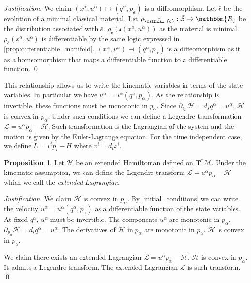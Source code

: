 \documentclass[aps,pra,10pt,twocolumn,floatfix,nofootinbib]{revtex4-1}
\numberwithin{equation}{section}
\theoremstyle{definition}
\newtheorem{prop}[equation]{Proposition}
\newenvironment{justification}{\emph{Justification}.}{\qed}
\begin{document}
\begin{justification}
	We claim $(x^\alpha, u^\alpha) \mapsto (q^\alpha, p_\alpha)$ is a diffeomorphism. Let $\bar{\mathcal{c}}$ be the evolution of a minimal classical material. Let $\rho_{\bar{\mathcal{c}}} : \bar{\mathcal{S}} \rightarrow \mathbbm{R}$ be the distribution associated with $\bar{\mathcal{c}}$. $\rho_{\bar{\mathcal{c}}}(\mathcal{s}(x^\alpha, u^\alpha))$ as the material is minimal. $\rho_{\bar{\mathcal{c}}}(x^\alpha, u^\alpha)$ is differentiable by the same logic expressed in \ref{prop:differentiable_manifold}. $(x^\alpha, u^\alpha) \mapsto (q^\alpha, p_\alpha)$ is a diffeomorphism as it as a homeomorphism that maps a differentiable function to a differentiable function.
\end{justification}

This relationship allows us to write the kinematic variables in terms of the state variables. In particular we have $u^\alpha=u^\alpha(q^\alpha, p_\alpha)$. As the relationship is invertible, these functions must be monotonic in $p_\alpha$. Since $\partial_{p_\alpha} \mathcal{H}=d_s q^\alpha= u^\alpha$, $\mathcal{H}$ is convex in $p_\alpha$. Under such conditions we can define a Legendre transformation $\mathcal{L}=u^\alpha p_\alpha - \mathcal{H}$. Such transformation is the Lagrangian of the system and the motion is given by the Euler-Lagrange equation. For the time independent case, we define $L=v^i p_i - H$ where $v^i=d_t x^i$.

\begin{prop}\label{lagrangian_mechanics}
	Let $\mathcal{H}$ be an extended Hamiltonian defined on $\mathbf{T}^*\mathcal{M}$. Under the kinematic assumption, we can define the Legendre transform $\mathcal{L}=u^\alpha p_\alpha - \mathcal{H}$ which we call the \emph{extended Lagrangian}.
\end{prop}

\begin{justification}
	We claim $\mathcal{H}$ is convex in $p_\alpha$. By \ref{initial_conditions} we can write the velocity $u^\alpha=u^\alpha(q^\alpha, p_\alpha)$ as a differentiable function of the state variables. At fixed $q^\alpha$, $u^\alpha$ must be invertible. The components $u^\alpha$ are monotonic in $p_\alpha$. $\partial_{p_\alpha} \mathcal{H}=d_s q^\alpha= u^\alpha$. The derivatives of $\mathcal{H}$ in $p_\alpha$ are monotonic in $p_\alpha$. $\mathcal{H}$ is convex in $p_\alpha$.
	
	We claim there exists an extended Lagrangian $\mathcal{L}=u^\alpha p_\alpha - \mathcal{H}$. $\mathcal{H}$ is convex in $p_\alpha$. It admits a Legendre transform. The extended Lagrangian $\mathcal{L}$ is such transform.
\end{justification}
\end{document}

